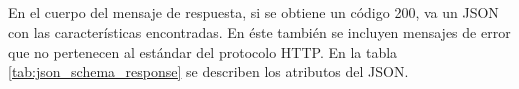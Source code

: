 

\subparagraph{}
\label{\detokenize{chapter_two/desc_cloudnao:respuesta}}

\subparagraph{}
\label{\detokenize{chapter_two/desc_cloudnao:id1}}
En el cuerpo del mensaje de respuesta, si se obtiene un código 200,
va un JSON con las características encontradas. En éste también
se incluyen mensajes de error que no pertenecen al estándar del protocolo HTTP.
En la tabla \ref{tab:json_schema_response} se describen los atributos del JSON.

